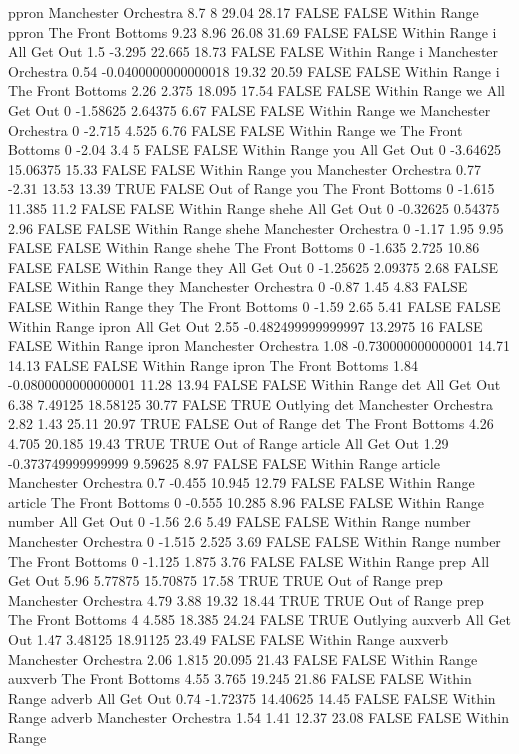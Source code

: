ppron Manchester Orchestra 8.7 8 29.04 28.17 FALSE FALSE Within Range
ppron The Front Bottoms 9.23 8.96 26.08 31.69 FALSE FALSE Within Range
i All Get Out 1.5 -3.295 22.665 18.73 FALSE FALSE Within Range
i Manchester Orchestra 0.54 -0.0400000000000018 19.32 20.59 FALSE FALSE Within Range
i The Front Bottoms 2.26 2.375 18.095 17.54 FALSE FALSE Within Range
we All Get Out 0 -1.58625 2.64375 6.67 FALSE FALSE Within Range
we Manchester Orchestra 0 -2.715 4.525 6.76 FALSE FALSE Within Range
we The Front Bottoms 0 -2.04 3.4 5 FALSE FALSE Within Range
you All Get Out 0 -3.64625 15.06375 15.33 FALSE FALSE Within Range
you Manchester Orchestra 0.77 -2.31 13.53 13.39 TRUE FALSE Out of Range
you The Front Bottoms 0 -1.615 11.385 11.2 FALSE FALSE Within Range
shehe All Get Out 0 -0.32625 0.54375 2.96 FALSE FALSE Within Range
shehe Manchester Orchestra 0 -1.17 1.95 9.95 FALSE FALSE Within Range
shehe The Front Bottoms 0 -1.635 2.725 10.86 FALSE FALSE Within Range
they All Get Out 0 -1.25625 2.09375 2.68 FALSE FALSE Within Range
they Manchester Orchestra 0 -0.87 1.45 4.83 FALSE FALSE Within Range
they The Front Bottoms 0 -1.59 2.65 5.41 FALSE FALSE Within Range
ipron All Get Out 2.55 -0.482499999999997 13.2975 16 FALSE FALSE Within Range
ipron Manchester Orchestra 1.08 -0.730000000000001 14.71 14.13 FALSE FALSE Within Range
ipron The Front Bottoms 1.84 -0.0800000000000001 11.28 13.94 FALSE FALSE Within Range
det All Get Out 6.38 7.49125 18.58125 30.77 FALSE TRUE Outlying
det Manchester Orchestra 2.82 1.43 25.11 20.97 TRUE FALSE Out of Range
det The Front Bottoms 4.26 4.705 20.185 19.43 TRUE TRUE Out of Range
article All Get Out 1.29 -0.373749999999999 9.59625 8.97 FALSE FALSE Within Range
article Manchester Orchestra 0.7 -0.455 10.945 12.79 FALSE FALSE Within Range
article The Front Bottoms 0 -0.555 10.285 8.96 FALSE FALSE Within Range
number All Get Out 0 -1.56 2.6 5.49 FALSE FALSE Within Range
number Manchester Orchestra 0 -1.515 2.525 3.69 FALSE FALSE Within Range
number The Front Bottoms 0 -1.125 1.875 3.76 FALSE FALSE Within Range
prep All Get Out 5.96 5.77875 15.70875 17.58 TRUE TRUE Out of Range
prep Manchester Orchestra 4.79 3.88 19.32 18.44 TRUE TRUE Out of Range
prep The Front Bottoms 4 4.585 18.385 24.24 FALSE TRUE Outlying
auxverb All Get Out 1.47 3.48125 18.91125 23.49 FALSE FALSE Within Range
auxverb Manchester Orchestra 2.06 1.815 20.095 21.43 FALSE FALSE Within Range
auxverb The Front Bottoms 4.55 3.765 19.245 21.86 FALSE FALSE Within Range
adverb All Get Out 0.74 -1.72375 14.40625 14.45 FALSE FALSE Within Range
adverb Manchester Orchestra 1.54 1.41 12.37 23.08 FALSE FALSE Within Range
